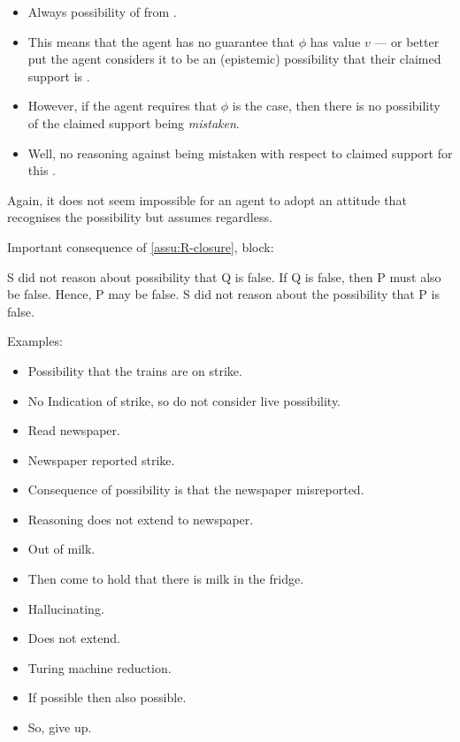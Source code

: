 \begin{note}
  \color{red}
    \begin{itemize}
    \item Always possibility of \mom{} from \nfcs{}.
    \item This means that the agent has no guarantee that \(\phi\) has value \(v\) --- or better put the agent considers it to be an (epistemic) possibility that their claimed support is \mom{}.
    \item However, if the agent requires that \(\phi\) is the case, then there is no possibility of the claimed support being \emph{mistaken}.
    \item Well, no reasoning against being mistaken with respect to claimed support for this \expec{}.
  \end{itemize}

  Again, it does not seem impossible for an agent to adopt an attitude that recognises the possibility but assumes regardless.
\end{note}

\begin{note}
  Important consequence of \autoref{assu:R-closure}, block:

  S did not reason about possibility that Q is false.
  If Q is false, then P must also be false.
  Hence, P may be false.
  S did not reason about the possibility that P is false.

  \begin{note}
  Examples:
  \begin{itemize}
  \item Possibility that the trains are on strike.
  \item No Indication of strike, so do not consider live possibility.
  \item Read newspaper.
  \item Newspaper reported strike.
  \item Consequence of possibility is that the newspaper misreported.
  \item Reasoning does not extend to newspaper.
  \end{itemize}

  \begin{itemize}
  \item Out of milk.
  \item Then come to hold that there is milk in the fridge.
  \item Hallucinating.
  \item Does not extend.
  \end{itemize}

  \begin{itemize}
  \item Turing machine reduction.
  \item If possible then also possible.
  \item So, give up.
  \end{itemize}
\end{note}
\end{note}

